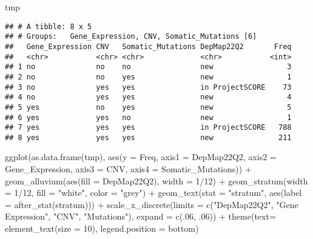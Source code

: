 \documentclass[
]{article}
\newenvironment{Shaded}{\begin{snugshade}}{\end{snugshade}}
\newcommand{\AttributeTok}[1]{\textcolor[rgb]{0.77,0.63,0.00}{#1}}
\newcommand{\DecValTok}[1]{\textcolor[rgb]{0.00,0.00,0.81}{#1}}
\newcommand{\FunctionTok}[1]{\textcolor[rgb]{0.00,0.00,0.00}{#1}}
\newcommand{\NormalTok}[1]{#1}
\newcommand{\SpecialCharTok}[1]{\textcolor[rgb]{0.00,0.00,0.00}{#1}}
\newcommand{\StringTok}[1]{\textcolor[rgb]{0.31,0.60,0.02}{#1}}
\begin{document}
\begin{Shaded}
\begin{Highlighting}[]
\NormalTok{tmp}
\end{Highlighting}
\end{Shaded}

\begin{verbatim}
## # A tibble: 8 x 5
## # Groups:   Gene_Expression, CNV, Somatic_Mutations [6]
##   Gene_Expression CNV   Somatic_Mutations DepMap22Q2       Freq
##   <chr>           <chr> <chr>             <chr>           <int>
## 1 no              no    no                new                 3
## 2 no              no    yes               new                 1
## 3 no              yes   yes               in ProjectSCORE    73
## 4 no              yes   yes               new                 4
## 5 yes             no    yes               new                 5
## 6 yes             yes   no                new                 1
## 7 yes             yes   yes               in ProjectSCORE   788
## 8 yes             yes   yes               new               211
\end{verbatim}

\begin{Shaded}
\begin{Highlighting}[]
\FunctionTok{ggplot}\NormalTok{(}\FunctionTok{as.data.frame}\NormalTok{(tmp),}
             \FunctionTok{aes}\NormalTok{(}\AttributeTok{y =}\NormalTok{ Freq, }\AttributeTok{axis1 =}\NormalTok{ DepMap22Q2, }
                 \AttributeTok{axis2 =}\NormalTok{ Gene\_Expression, }\AttributeTok{axis3 =}\NormalTok{ CNV, }
                 \AttributeTok{axis4 =}\NormalTok{ Somatic\_Mutations)) }\SpecialCharTok{+}
  \FunctionTok{geom\_alluvium}\NormalTok{(}\FunctionTok{aes}\NormalTok{(}\AttributeTok{fill =}\NormalTok{ DepMap22Q2), }\AttributeTok{width =} \DecValTok{1}\SpecialCharTok{/}\DecValTok{12}\NormalTok{) }\SpecialCharTok{+}
  \FunctionTok{geom\_stratum}\NormalTok{(}\AttributeTok{width =} \DecValTok{1}\SpecialCharTok{/}\DecValTok{12}\NormalTok{, }\AttributeTok{fill =} \StringTok{"white"}\NormalTok{, }\AttributeTok{color =} \StringTok{"grey"}\NormalTok{) }\SpecialCharTok{+}
  \FunctionTok{geom\_text}\NormalTok{(}\AttributeTok{stat =} \StringTok{"stratum"}\NormalTok{, }\FunctionTok{aes}\NormalTok{(}\AttributeTok{label =} \FunctionTok{after\_stat}\NormalTok{(stratum))) }\SpecialCharTok{+}
  \FunctionTok{scale\_x\_discrete}\NormalTok{(}\AttributeTok{limits =} \FunctionTok{c}\NormalTok{(}\StringTok{"DepMap22Q2"}\NormalTok{, }\StringTok{"Gene Expression"}\NormalTok{, }\StringTok{"CNV"}\NormalTok{, }\StringTok{"Mutations"}\NormalTok{), }\AttributeTok{expand =} \FunctionTok{c}\NormalTok{(.}\DecValTok{06}\NormalTok{, .}\DecValTok{06}\NormalTok{)) }\SpecialCharTok{+} 
  \FunctionTok{theme}\NormalTok{(}\AttributeTok{text=} \FunctionTok{element\_text}\NormalTok{(}\AttributeTok{size =} \DecValTok{10}\NormalTok{), }\AttributeTok{legend.position =} \StringTok{\textquotesingle{}bottom\textquotesingle{}}\NormalTok{)}
\end{Highlighting}
\end{Shaded}
\end{document}
